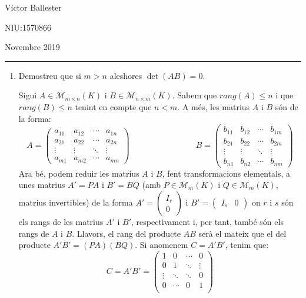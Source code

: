 \documentclass[11pt,a4paper]{article}
\begin{document}
\begin{flushright}
    Víctor Ballester\par NIU:1570866\par Novembre 2019
\end{flushright}
\rule{170mm}{0.1mm}
\begin{enumerate}
    \item Demostreu que si $m>n$ aleshores $\det(AB)=0$.\par
    Sigui $A\in \mathcal{M}_{m\times n}(K)$ i $B\in \mathcal{M}_{n\times m}(K)$. Sabem que $rang(A)\leq n$ i que $rang(B)\leq n$ tenint en compte que $n<m$. A més, les matrius $A$ i $B$ són de la forma: 
    $$A=\begin{pmatrix}
      a_{11} & a_{12} & \cdots & a_{1n} \\
      a_{21} & a_{22} & \cdots & a_{2n} \\
      \vdots & \vdots & \ddots & \vdots \\
      a_{m1} & a_{m2} & \cdots & a_{mn}
   \end{pmatrix}\qquad\qquad\qquad\qquad
   B=\begin{pmatrix}
      b_{11} & b_{12} & \cdots & b_{1m} \\
      b_{21} & b_{22} & \cdots & b_{2m} \\
      \vdots & \vdots & \ddots & \vdots \\
      b_{n1} & b_{n2} & \cdots & b_{nm}
   \end{pmatrix}$$
   Ara bé, podem reduir les matrius $A$ i $B$, fent transformacions elementals, a unes matrius $A'=PA$ i $B'=BQ$ (amb $P\in \mathcal{M}_m(K)$ i $Q\in \mathcal{M}_m(K)$, matrius invertibles) de la forma 
   $A'=\begin{pmatrix}
   I_r \\
   0
   \end{pmatrix}$
   i
   $B'=\begin{pmatrix}
   I_s & 0
   \end{pmatrix}$
   on $r$ i $s$ són els rangs de les matrius $A'$ i $B'$, respectivament i, per tant, també són els rangs de $A$ i $B$. Llavors, el rang del producte $AB$ serà el mateix que el del producte $A'B'=(PA)(BQ)$. Si anomenem $C=A'B'$, tenim que: 
   $$C=A'B'=\begin{pmatrix}
      1 & 0 & \cdots & 0 \\
      0 & 1 & \ddots & \vdots \\
      \vdots & \ddots & \ddots & 0 \\
      0 & \cdots & 0 & 1 \\

\end{pmatrix}$$
\end{enumerate}
\end{document}

